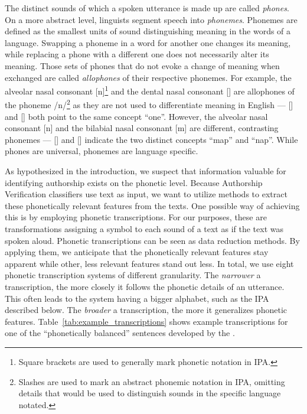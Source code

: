 The distinct sounds of which a spoken utterance is made up are called \textit{phones}.
On a more abstract level, linguists segment speech into \textit{phonemes}.
Phonemes are defined as the smallest units of sound distinguishing meaning in the words of a language.
Swapping a phoneme in a word for another one changes its meaning, while replacing a phone with a different one does not necessarily alter its meaning.
Those sets of phones that do not evoke a change of meaning when exchanged are called \textit{allophones} of their respective phonemes.
For example, the alveolar nasal consonant [n]\footnote{Square brackets are used to generally mark phonetic notation in IPA.} and the dental nasal consonant [\textipa{\|[n}] are allophones of the phoneme /n/\footnote{Slashes are used to mark an abstract phonemic notation in IPA, omitting details that would be used to distinguish sounds in the specific language notated.} as they are not used to differentiate meaning in English --- [] and [\textipa{w2\|[n}] both point to the same concept ``one''.
However, the alveolar nasal consonant [n] and the bilabial nasal consonant [m] are different, contrasting phonemes --- [] and [] indicate the two distinct concepts ``map'' and ``nap''.
While phones are universal, phonemes are language specific.

As hypothesized in the introduction, we suspect that information valuable for identifying authorship exists on the phonetic level.
Because Authorship Verification classifiers use text as input, we want to utilize methods to extract these phonetically relevant features from the texts.
One possible way of achieving this is by employing phonetic transcriptions.
For our purposes, these are transformations assigning a symbol to each sound of a text as if the text was spoken aloud.
Phonetic transcriptions can be seen as data reduction methods.
By applying them, we anticipate that the phonetically relevant features stay apparent while other, less relevant features stand out less.
In total, we use eight phonetic transcription systems of different granularity.
The \textit{narrower} a transcription, the more closely it follows the phonetic details of an utterance.
This often leads to the system having a bigger alphabet, such as the IPA described below.
The \textit{broader} a transcription, the more it generalizes phonetic features.
Table~\ref{tab:example_transcriptions} shows example transcriptions for one of the ``phonetically balanced'' sentences developed by the \cite{ieee1969sentences}.\newline

